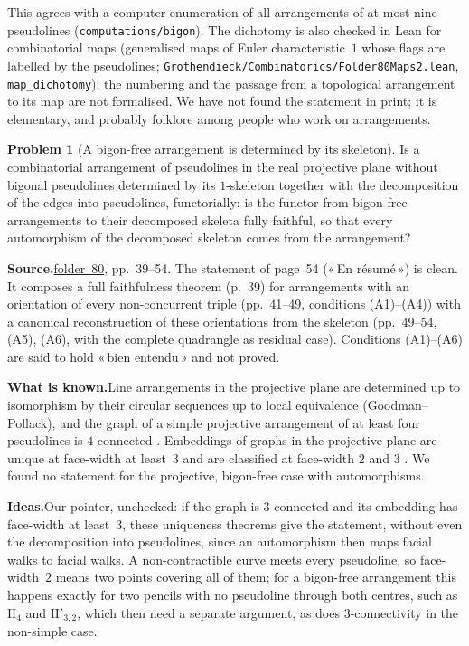 \documentclass[11pt]{article}
\newcommand{\q}[1]{«\,#1\,»}
\newcommand{\fac}[1]{\href{https://grothendieck.umontpellier.fr/#1.pdf}{folder~#1}}
\theoremstyle{definition}
\newtheorem{problem}{Problem}
\theoremstyle{plain}\newtheorem*{proposition}{Proposition}\theoremstyle{definition}
\newcommand{\entry}[1]{\par\medskip\noindent\textbf{#1}\enspace}
\newcommand{\src}[1]{\entry{Source.}#1}
\newcommand{\known}{\entry{What is known.}}
\newcommand{\ideas}{\entry{Ideas.}}
\begin{document}
This agrees with a computer enumeration of all arrangements of at most nine pseudolines (\nolinkurl{computations/bigon}). The dichotomy is also checked in Lean for combinatorial maps (generalised maps of Euler characteristic~$1$ whose flags are labelled by the pseudolines; \nolinkurl{Grothendieck/Combinatorics/Folder80Maps2.lean}, \texttt{map\_dichotomy}); the numbering and the passage from a topological arrangement to its map are not formalised. We have not found the statement in print; it is elementary, and probably folklore among people who work on arrangements.

\begin{problem}[A bigon-free arrangement is determined by its skeleton]\label{p:skel}
Is a combinatorial arrangement of pseudolines in the real projective plane without bigonal pseudolines determined by its $1$-skeleton together with the decomposition of the edges into pseudolines, functorially: is the functor from bigon-free arrangements to their decomposed skeleta fully faithful, so that every automorphism of the decomposed skeleton comes from the arrangement?
\end{problem}

\src{\fac{80}, pp.~39--54. The statement of page~54 (\q{En résumé}) is clean. It composes a full faithfulness theorem (p.~39) for arrangements with an orientation of every non-concurrent triple (pp.~41--49, conditions (A1)--(A4)) with a canonical reconstruction of these orientations from the skeleton (pp.~49--54, (A5), (A6), with the complete quadrangle as residual case). Conditions (A1)--(A6) are said to hold \q{bien entendu} and not proved.}

\known Line arrangements in the projective plane are determined up to isomorphism by their circular sequences up to local equivalence (Goodman--Pollack), and the graph of a simple projective arrangement of at least four pseudolines is $4$-connected \cite[Th.~5.2.2, 5.5.1]{felsnergoodman}. Embeddings of graphs in the projective plane are unique at face-width at least~$3$ and are classified at face-width $2$ and $3$ \cite{vitray,mohar1995,mohar-robertson-vitray}. We found no statement for the projective, bigon-free case with automorphisms.

\ideas Our pointer, unchecked: if the graph is $3$-connected and its embedding has face-width at least~$3$, these uniqueness theorems give the statement, without even the decomposition into pseudolines, since an automorphism then maps facial walks to facial walks. A non-contractible curve meets every pseudoline, so face-width~$2$ means two points covering all of them; for a bigon-free arrangement this happens exactly for two pencils with no pseudoline through both centres, such as $\mathrm{II}_4$ and $\mathrm{II}'_{3,2}$, which then need a separate argument, as does $3$-connectivity in the non-simple case.
\end{document}
